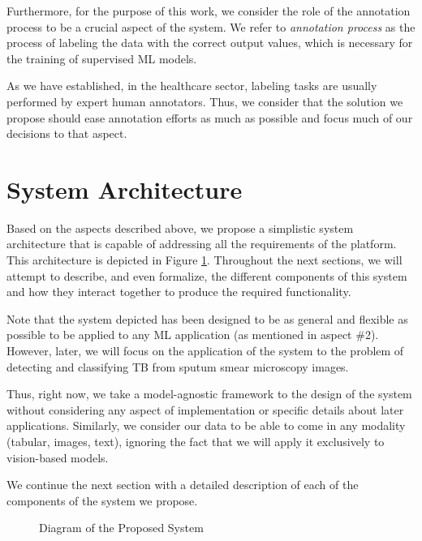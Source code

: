 \documentclass[../main.tex]{subfiles}
\begin{document}
    Furthermore, for the purpose of this work, we consider the role of the annotation process to be a crucial aspect of the system. We refer to \textit{annotation process} as the process of labeling the data with the correct output values, which is necessary for the training of supervised ML models. 
    
    
    As we have established, in the healthcare sector, labeling tasks are usually performed by expert human annotators. Thus, we consider that the solution we propose should ease annotation efforts as much as possible and focus much of our decisions to that aspect.

    \vspace{-0.3cm}
    
    \section{System Architecture} 
    Based on the aspects described above, we propose a simplistic system architecture that is capable of addressing all the requirements of the platform. This architecture is depicted in Figure \ref{fig:system_proposal_diagram}. Throughout the next sections, we will attempt to describe, and even formalize, the different components of this system and how they interact together to produce the required functionality. 

    Note that the system depicted has been designed to be as general and flexible as possible to be applied to any ML application (as mentioned in aspect \#2). However, later, we will focus on the application of the system to the problem of detecting and classifying TB from sputum smear microscopy images. 
    
    Thus, right now, we take a model-agnostic framework to the design of the system without considering any aspect of implementation or specific details about later applications.  Similarly, we consider our data to be able to come in any modality (tabular, images, text), ignoring the fact that we will apply it exclusively to vision-based models.

    We continue the next section with a detailed description of each of the components of the system we propose.
    
    
    \begin{figure}[t]
        \centering
        \caption{Diagram of the Proposed System}
        \hspace*{-0.5cm}
        \label{fig:system_proposal_diagram}
    \end{figure}
\end{document}
